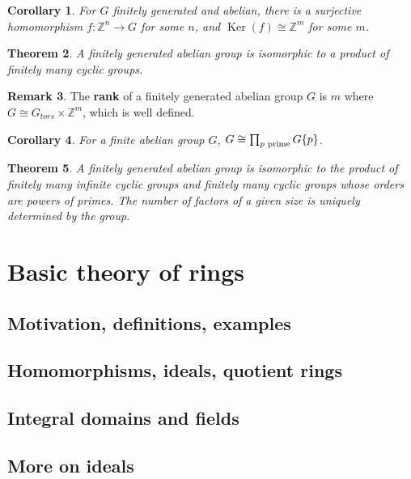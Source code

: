 \documentclass[12pt]{article}
\newtheorem{thm}{Theorem}[section]
\newtheorem{cor}[thm]{Corollary}
\theoremstyle{definition}
\newtheorem{rmk}[thm]{Remark}
\newcommand{\Z}{\mathbb{Z}}
\DeclareMathOperator{\Ker}{Ker}
\begin{document}
\begin{cor}
  For $G$ finitely generated and abelian, there is a surjective homomorphism $f : \Z^n \to G$ for some $n$, and $\Ker(f) \cong \Z^m$ for some $m$.
\end{cor}

\begin{thm}
  A finitely generated abelian group is isomorphic to a product of finitely many cyclic groups.
\end{thm}

\begin{rmk}
  The \textbf{rank} of a finitely generated abelian group $G$ is $m$ where $G \cong G_{tors} \times \Z^m$, which is well defined.
\end{rmk}

\begin{cor}
  For a finite abelian group $G$, $G \cong \prod_{p \textnormal{ prime}}G\{p\}$.
\end{cor}

\begin{thm}
  A finitely generated abelian group is isomorphic to the product of finitely many infinite cyclic groups and finitely many cyclic groups whose orders are powers of primes.
  The number of factors of a given size is uniquely determined by the group.
\end{thm}

\section{Basic theory of rings}

\subsection{Motivation, definitions, examples}

\subsection{Homomorphisms, ideals, quotient rings}

\subsection{Integral domains and fields}

\subsection{More on ideals}
\end{document}

